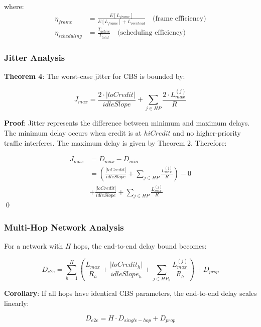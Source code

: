 \documentclass[10pt, journal, compsoc]{IEEEtran}
\begin{document}
where:
\begin{align}
\eta_{frame} &= \frac{E[L_{frame}]}{E[L_{frame}] + L_{overhead}} \quad \text{(frame efficiency)} \\
\eta_{scheduling} &= \frac{T_{active}}{T_{total}} \quad \text{(scheduling efficiency)}
\end{align}

\subsubsection{Jitter Analysis}

\textbf{Theorem 4}: The worst-case jitter for CBS is bounded by:

\begin{equation}
J_{max} = \frac{2 \cdot |loCredit|}{idleSlope} + \sum_{j \in HP} \frac{2 \cdot L_{max}^{(j)}}{R}
\end{equation}

\textbf{Proof}: Jitter represents the difference between minimum and maximum delays. The minimum delay occurs when credit is at $hiCredit$ and no higher-priority traffic interferes. The maximum delay is given by Theorem 2. Therefore:

\begin{align}
J_{max} &= D_{max} - D_{min} \\
&= \left(\frac{|loCredit|}{idleSlope} + \sum_{j \in HP} \frac{L_{max}^{(j)}}{R}\right) - 0 \\
&+ \frac{|loCredit|}{idleSlope} + \sum_{j \in HP} \frac{L_{max}^{(j)}}{R}
\end{align} \qed

\subsubsection{Multi-Hop Network Analysis}

For a network with $H$ hops, the end-to-end delay bound becomes:

\begin{equation}
D_{e2e} = \sum_{h=1}^{H} \left( \frac{L_{max}}{R_h} + \frac{|loCredit_h|}{idleSlope_h} + \sum_{j \in HP_h} \frac{L_{max}^{(j)}}{R_h} \right) + D_{prop}
\end{equation}

\textbf{Corollary}: If all hops have identical CBS parameters, the end-to-end delay scales linearly:

\begin{equation}
D_{e2e} = H \cdot D_{single-hop} + D_{prop}
\end{equation}
\end{document}
